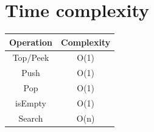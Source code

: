	
	\section{Time complexity}
	
	\begin{center}
		\begin{tabular}{||c c||}
		\hline
		Operation & Complexity\\
		\hline\hline
		Top/Peek & O(1)\\
		\hline
		Push & O(1)\\
		\hline
		Pop & O(1)\\
		\hline
		isEmpty & O(1)\\
		\hline
		Search & O(n)\\
		\hline
			
		\end{tabular}
	\end{center}
	
	
	